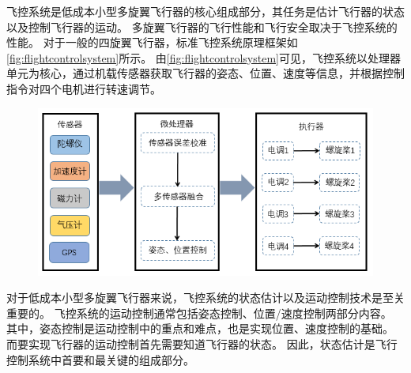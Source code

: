 \documentclass[
  type=master
]{gdutthesis}
\begin{document}
飞控系统是低成本小型多旋翼飞行器的核心组成部分，其任务是估计飞行器的状态以及控制飞行器的运动。
多旋翼飞行器的飞行性能和飞行安全取决于飞控系统的性能。
对于一般的四旋翼飞行器，标准飞控系统原理框架如\autoref{fig:flightcontrolsystem}所示。
由\autoref{fig:flightcontrolsystem}可见，飞控系统以处理器单元为核心，通过机载传感器获取飞行器的姿态、位置、速度等信息，并根据控制指令对四个电机进行转速调节。
\begin{figure}[H]
	\centering
	\includegraphics[width=1.0\textwidth]{屏幕截图 2022-06-08 090529.png}
	\label{fig:flightcontrolsystem}
\end{figure}

对于低成本小型多旋翼飞行器来说，飞控系统的状态估计以及运动控制技术是至关重要的。
飞控系统的运动控制通常包括姿态控制、位置/速度控制两部分内容。
其中，姿态控制是运动控制中的重点和难点，也是实现位置、速度控制的基础。
而要实现飞行器的运动控制首先需要知道飞行器的状态。
因此，状态估计是飞行控制系统中首要和最关键的组成部分。

%
%
\end{document}
